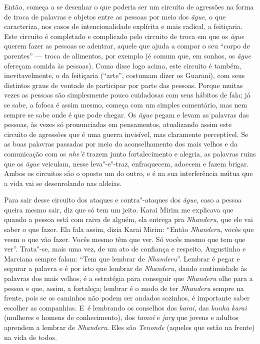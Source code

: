 Então, começa a se desenhar o que poderia ser um circuito de agressões
na forma de troca de palavras e objetos entre as pessoas por meio dos
\emph{ãgue}, o que caracteriza, nos casos de intencionalidade explícita e mais
radical, a feitiçaria. Este circuito é completado e complicado pelo
circuito de troca em que os \emph{ãgue} querem fazer as pessoas se adentrar,
aquele que ajuda a compor o seu ``corpo de parentes'' --- troca de
alimentos, por exemplo (é comum que, em sonhos, os \emph{ãgue} ofereçam comida
às pessoas). Como disse logo acima, este circuito é também,
inevitavelmente, o da feitiçaria (``arte'', costumam dizer os Guarani),
com seus distintos graus de vontade de participar por parte das
pessoas. Porque muitas vezes as pessoas são simplesmente pouco
cuidadosas com seus hábitos de fala; já se sabe, a fofoca é assim
mesmo, começa com um simples comentário, mas nem sempre se sabe onde é
que pode chegar. Os \emph{ãgue} pegam e levam as palavras das pessoas, às
vezes só pronunciadas em pensamentos, atualizando assim este circuito
de agressões que é uma guerra invisível, mas claramente perceptível. Se
as boas palavras passadas por meio do aconselhamento dos mais velhos e
da comunicação com os \emph{nhe’ẽ} trazem junto fortalecimento e
alegria, as palavras ruins que os \emph{ãgue} veiculam, nesse leva"-e"-traz,
enfraquecem, adoecem e fazem brigar. Ambos os circuitos são o oposto um
do outro, e é na sua interferência mútua que a vida vai se desenrolando
nas aldeias. 

Para sair desse circuito dos ataques e contra"-ataques dos \emph{ãgue}, caso a
pessoa queira mesmo sair, diz que só tem um jeito. Karai Mirim me
explicava que quando a pessoa está com raiva de alguém, ela entrega pra
\emph{Nhanderu}, que ele vai saber o que fazer. Ela fala assim, dizia Karai
Mirim: ``Então \emph{Nhanderu}, vocês que veem o que vão fazer. Vocês mesmo têm
que ver. Só vocês mesmo que tem que ver''. Trata"-se, mais uma vez, de um
ato de confiança e respeito. Augustinho e Marciana sempre falam: ``Tem
que lembrar de \emph{Nhanderu}''. Lembrar é pegar e segurar a palavra e é por
isto que lembrar de \emph{Nhanderu}, dando continuidade às palavras dos mais
velhos, é a estratégia para conseguir que \emph{Nhanderu} olhe para a pessoa e
que, assim, a fortaleça; lembrar é o modo de ter \emph{Nhanderu} sempre na
frente, pois se os caminhos não podem ser andados sozinhos, é
importante saber escolher as companhias. E~é lembrando os conselhos dos
\emph{karai}, das \emph{kunha karai} (mulheres e homens de conhecimento), dos
\emph{tamoĩ} e \emph{jary} que jovens e adultos aprendem a lembrar de \emph{Nhanderu}.
Eles são \emph{Tenonde} (aqueles que estão na frente) na vida de todos.

